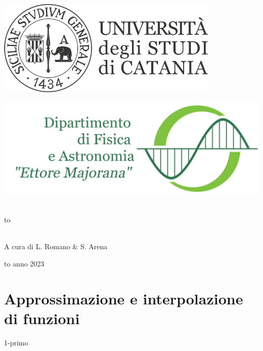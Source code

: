\documentclass[12pt]{article}
\newcommand\blankpage{%
    \null
    \thispagestyle{empty}%
    \newpage}
\begin{document}
\thispagestyle{empty}
\begin{center}

\begin{minipage}[c]{0.45\textwidth}
\begin{flushleft}
\includegraphics[width=0.8\textwidth]{logo-unict-orizzontale-grigio.png}
\end{flushleft}
\end{minipage}
\hfill
\begin{minipage}[c]{0.45\textwidth}
\begin{flushright}
\includegraphics[width=\textwidth]{logo_dfa_orizzontale}
\end{flushright}
\end{minipage}\\
\medskip
\hbox to \textwidth{\hrulefill}

\vfill
\vfill


\uppercase{}\\

\vfill
\large{A cura di L. Romano \& S. Arena}

\vfill
\vfill
\hbox to \textwidth{\hrulefill}
{\sc anno 2023}
\end{center}

\newpage

\blankpage

\tableofcontents

\newpage

\blankpage






\section{Approssimazione e interpolazione di funzioni}
{1-primo}
\end{document}
